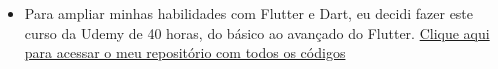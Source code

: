 \begin{itemize}
\item Para ampliar minhas habilidades com Flutter e Dart, eu decidi fazer este curso da Udemy de 40 horas, do básico ao avançado do Flutter.
\href{https://github.com/GustavoLR548/MeusAPPsFlutter}{Clique aqui para acessar o meu repositório com todos os códigos}
\end{itemize}
\smallskip




\cvproject{}